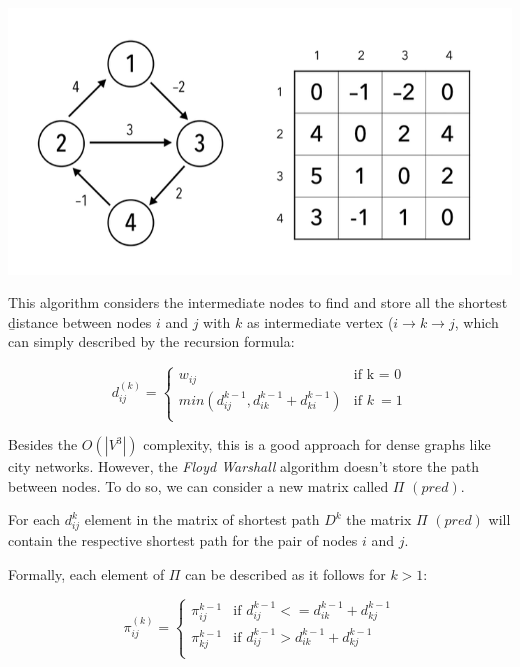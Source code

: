 \documentclass{article}
\begin{document}
    \includegraphics{algorithm-diagram}

    This algorithm considers the intermediate nodes to find and store all the shortest \b{distance} between nodes $i$ and $j$ with $k$ as intermediate vertex ($i \rightarrow k \rightarrow j$, which can simply described by the recursion formula: 
    
    \begin{equation} 
      d_{ij}^{(k)} =
        \begin{cases}
          w_{ij} & \text{if k = 0}\\
          min(d_{ij}^{k-1}, d_{ik}^{k-1} + d_{ki}^{k-1}) & \text{if } k\>= 1\\
        \end{cases}       
    \end{equation}
    
    Besides the $O(|V^3|)$ complexity, this is a good approach for dense graphs like city networks.
    However, the \textit{Floyd Warshall} algorithm doesn't store the path between nodes. To do so, we can consider a new matrix called $\Pi$ $(pred)$. \par
    For each $d_{ij}^{k}$ element in the matrix of shortest path $D^k$ the matrix $\Pi$ $(pred)$ will contain the respective shortest path for the pair of nodes $i$ and $j$. \par
    Formally, each element of $\Pi$ can be described as it follows for $k>1$:
    
    \begin{equation} 
      \pi_{ij}^{(k)} =
        \begin{cases}
          \pi_{ij}^{k-1} & \text{if } d_{ij}^{k-1} <= d_{ik}^{k-1} + d_{kj}^{k-1} \\
          \pi_{kj}^{k-1} & \text{if } d_{ij}^{k-1} > d_{ik}^{k-1} + d_{kj}^{k-1}\\
        \end{cases}       
    \end{equation}
    
\end{document}
